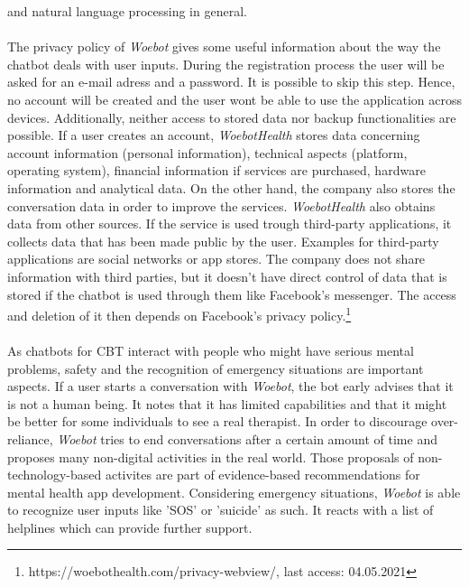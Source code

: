 \documentclass[sigconf, nonacm]{acmart}
\begin{document}
and natural language processing in general.\cite{Fitzpatrick2017}
\\\\
The privacy policy of \emph{Woebot} gives some useful information about the way the chatbot deals with user inputs. 
During the registration process the user will be asked for an e-mail adress and a password. It is possible to skip
this step. Hence, no account will be created and the user wont be able to use the application across devices. 
Additionally, neither access to stored data nor backup functionalities are possible. If a user creates an account, \emph{WoebotHealth} stores
data concerning account information (personal information), technical aspects (platform, operating system), financial information if 
services are purchased, hardware information and analytical data. On the other hand, the company also stores the conversation data in order
to improve the services. \emph{WoebotHealth} also obtains data from other sources. If the service is used trough third-party applications, 
it collects data that has been made public by the user. Examples for third-party applications are social networks or app stores. 
The company does not share information with third parties, but it doesn't have direct control of data that is stored if the chatbot
is used through them like Facebook's messenger. The access and deletion of it then depends on Facebook's privacy policy.\footnote{https://woebothealth.com/privacy-webview/, last access: 04.05.2021}
\\\\
As chatbots for CBT interact with people who might have serious mental problems, safety and the recognition of emergency situations are important
aspects. If a user starts a conversation with \emph{Woebot}, the bot early advises that it is not a human being. It notes that it has limited capabilities and that it might 
be better for some individuals to see a real therapist. In order to discourage over-reliance, \emph{Woebot} tries to end conversations after a certain amount of time and proposes many non-digital activities in the real world.
Those proposals of non-technology-based activites are part of evidence-based recommendations for mental health app development\cite{Bakker2016}.
Considering emergency situations, \emph{Woebot} is able to recognize user inputs like 'SOS' or 'suicide' as such. It reacts with a list of helplines
which can provide further support.\cite{Kretzschmar2019}
\end{document}
